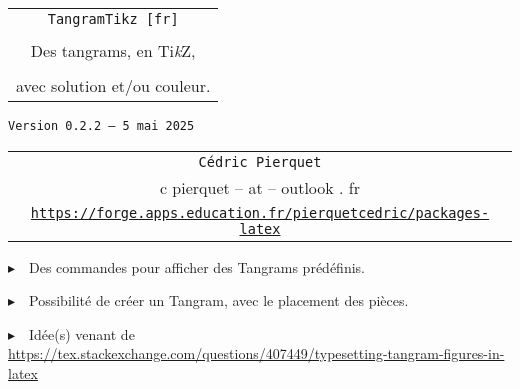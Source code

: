 \documentclass{article}
\def\TPversion{0.2.2}
\def\TPdate{5 mai 2025}
\begin{document}
\pagestyle{fancy}

\thispagestyle{empty}

\vspace{2cm}

\begin{center}
	\begin{minipage}{0.75\linewidth}
	\begin{tcolorbox}[colframe=yellow,colback=yellow!15]
		\begin{center}
			\begin{tabular}{c}
				{\Huge \texttt{TangramTikz [fr]}}\\
				\\
				{\LARGE Des tangrams, en Ti\textit{k}Z}, \\
				\\
				{\LARGE avec solution et/ou couleur.} \\
			\end{tabular}
			
			\medskip
			
			{\small \texttt{Version \TPversion{} -- \TPdate}}
		\end{center}
	\end{tcolorbox}
\end{minipage}
\end{center}

\vspace{0.5cm}

\begin{center}
	\begin{tabular}{c}
	\texttt{Cédric Pierquet}\\
	{\ttfamily c pierquet -- at -- outlook . fr}\\
	\texttt{\url{https://forge.apps.education.fr/pierquetcedric/packages-latex}}
\end{tabular}
\end{center}

\vspace{0.5cm}

{$\blacktriangleright$~~Des commandes pour afficher des Tangrams prédéfinis.}

\smallskip

{$\blacktriangleright$~~Possibilité de créer un Tangram, avec le placement des pièces.}

\smallskip

{$\blacktriangleright$~~Idée(s) venant de \url{https://tex.stackexchange.com/questions/407449/typesetting-tangram-figures-in-latex}}

\vspace{0.5cm}
\end{document}
